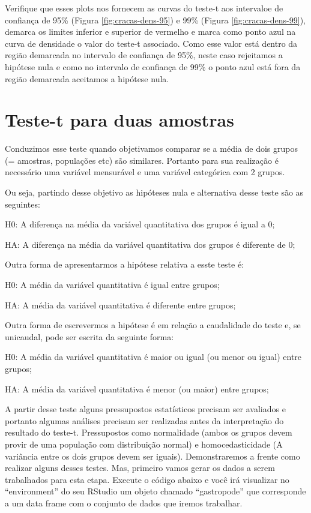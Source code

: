 \documentclass[]{book}
\begin{document}
Verifique que esses plots nos fornecem as curvas do teste-t aos intervaloe de confiança de 95\% (Figura \ref{fig:cracas-dens-95}) e 99\% (Figura \ref{fig:cracas-dens-99}), demarca os limites inferior e superior de vermelho e marca como ponto azul na curva de densidade o valor do teste-t associado. Como esse valor está dentro da região demarcada no intervalo de confiança de 95\%, neste caso rejeitamos a hipótese nula e como no intervalo de confiança de 99\% o ponto azul está fora da região demarcada aceitamos a hipótese nula.

\hypertarget{teste-t-para-duas-amostras}{%
\section{Teste-t para duas amostras}\label{teste-t-para-duas-amostras}}

Conduzimos esse teste quando objetivamos comparar se a média de dois grupos (= amostras, populações etc) são similares. Portanto para sua realização é necessário uma variável mensurável e uma variável categórica com 2 grupos.

Ou seja, partindo desse objetivo as hipóteses nula e alternativa desse teste são as seguintes:

H0: A diferença na média da variável quantitativa dos grupos é igual a 0;

HA: A diferença na média da variável quantitativa dos grupos é diferente de 0;

Outra forma de apresentarmos a hipótese relativa a esste teste é:

H0: A média da variável quantitativa é igual entre grupos;

HA: A média da variável quantitativa é diferente entre grupos;

Outra forma de escrevermos a hipótese é em relação a caudalidade do teste e, se unicaudal, pode ser escrita da seguinte forma:

H0: A média da variável quantitativa é maior ou igual (ou menor ou igual) entre grupos;

HA: A média da variável quantitativa é menor (ou maior) entre grupos;

A partir desse teste alguns pressupostos estatísticos precisam ser avaliados e portanto algumas análises precisam ser realizadas antes da interpretação do resultado do teste-t. Pressupostos como normalidade (ambos os grupos devem provir de uma população com distribuição normal) e homocedasticidade (A variância entre os dois grupos devem ser iguais). Demonstraremos a frente como realizar alguns desses testes. Mas, primeiro vamos gerar os dados a serem trabalhados para esta etapa. Execute o código abaixo e você irá visualizar no ``environment'' do seu RStudio um objeto chamado ``gastropode'' que corresponde a um data frame com o conjunto de dados que iremos trabalhar.
\end{document}
